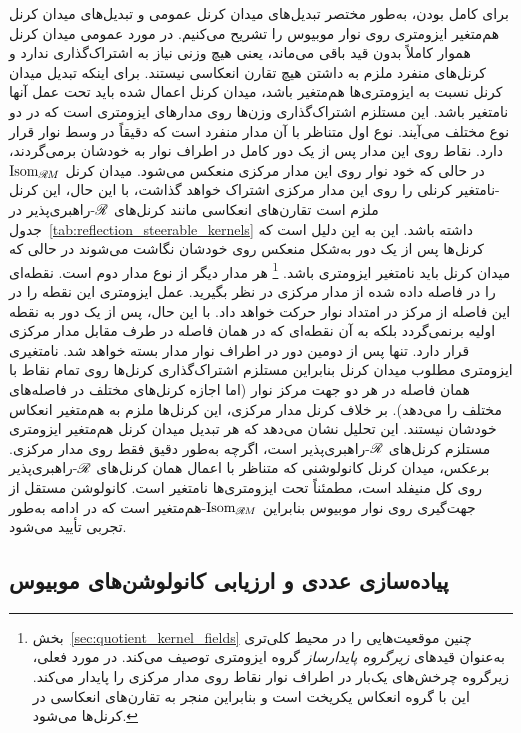 برای کامل بودن، به‌طور مختصر تبدیل‌های میدان کرنل عمومی و تبدیل‌های میدان کرنل هم‌متغیر ایزومتری روی نوار موبیوس را تشریح می‌کنیم.
در مورد عمومی میدان کرنل هموار کاملاً بدون قید باقی می‌ماند، یعنی هیچ وزنی نیاز به اشتراک‌گذاری ندارد و کرنل‌های منفرد ملزم به داشتن هیچ تقارن انعکاسی نیستند.
برای اینکه تبدیل میدان کرنل نسبت به ایزومتری‌ها هم‌متغیر باشد، میدان کرنل اعمال شده باید تحت عمل آنها نامتغیر باشد.
این مستلزم اشتراک‌گذاری وزن‌ها روی مدارهای ایزومتری است که در دو نوع مختلف می‌آیند.
نوع اول متناظر با آن مدار منفرد است که دقیقاً در وسط نوار قرار دارد.
نقاط روی این مدار پس از یک دور کامل در اطراف نوار به خودشان برمی‌گردند، در حالی که خود نوار روی این مدار مرکزی منعکس می‌شود.
میدان کرنل $\operatorname{Isom}_{\mathscr{R}\mkern-1.8muM}$-نامتغیر کرنلی را روی این مدار مرکزی اشتراک خواهد گذاشت، با این حال، این کرنل ملزم است تقارن‌های انعکاسی مانند کرنل‌های $\mathscr{R}$-راهبری‌پذیر در جدول~\ref{tab:reflection_steerable_kernels} داشته باشد.
این به این دلیل است که کرنل‌ها پس از یک دور به‌شکل منعکس روی خودشان نگاشت می‌شوند در حالی که میدان کرنل باید نامتغیر ایزومتری باشد.%
\footnote{
	بخش~\ref{sec:quotient_kernel_fields} چنین موقعیت‌هایی را در محیط کلی‌تری به‌عنوان قیدهای \emph{زیرگروه پایدارساز} گروه ایزومتری توصیف می‌کند.
	در مورد فعلی، زیرگروه چرخش‌های یک‌بار در اطراف نوار نقاط روی مدار مرکزی را پایدار می‌کند.
	این با گروه انعکاس یکریخت است و بنابراین منجر به تقارن‌های انعکاسی در کرنل‌ها می‌شود.
}
هر مدار دیگر از نوع مدار دوم است.
نقطه‌ای را در فاصله داده شده از مدار مرکزی در نظر بگیرید.
عمل ایزومتری این نقطه را در این فاصله از مرکز در امتداد نوار حرکت خواهد داد.
با این حال، پس از یک دور به نقطه اولیه برنمی‌گردد بلکه به آن نقطه‌ای که در همان فاصله در طرف مقابل مدار مرکزی قرار دارد.
تنها پس از دومین دور در اطراف نوار مدار بسته خواهد شد.
نامتغیری ایزومتری مطلوب میدان کرنل بنابراین مستلزم اشتراک‌گذاری کرنل‌ها روی تمام نقاط با همان فاصله در هر دو جهت مرکز نوار (اما اجازه کرنل‌های مختلف در فاصله‌های مختلف را می‌دهد).
بر خلاف کرنل مدار مرکزی، این کرنل‌ها ملزم به هم‌متغیر انعکاس خودشان نیستند.
این تحلیل نشان می‌دهد که هر تبدیل میدان کرنل هم‌متغیر ایزومتری مستلزم کرنل‌های $\mathscr{R}$-راهبری‌پذیر است، اگرچه به‌طور دقیق فقط روی مدار مرکزی.
برعکس، میدان کرنل کانولوشنی که متناظر با اعمال همان کرنل‌های $\mathscr{R}$-راهبری‌پذیر روی کل منیفلد است، مطمئناً تحت ایزومتری‌ها نامتغیر است.
کانولوشن مستقل از جهت‌گیری روی نوار موبیوس بنابراین $\operatorname{Isom}_{\mathscr{R}\mkern-1.8muM}$-هم‌متغیر است که در ادامه به‌طور تجربی تأیید می‌شود.




\subsection{پیاده‌سازی عددی و ارزیابی کانولوشن‌های موبیوس}
\label{sec:mobius_experiment_main}

